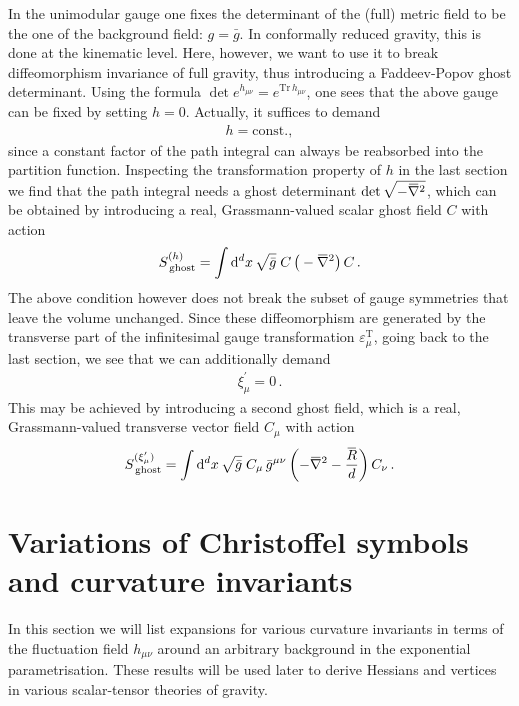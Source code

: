 \documentclass[11pt]{book}
\newcommand{\overbar}[1]{\mkern 1.5mu\overline{\mkern-1.5mu#1\mkern-1.5mu}\mkern 1.5mu}
\newcommand{\bnabla}{\overbar \nabla}
\newcommand{\bR}{\overbar R}
\newcommand{\Tr}{\mathrm{Tr}}
\numberwithin{equation}{chapter}
\begin{document}
\begin{appendices}
In the unimodular gauge one fixes the determinant of the (full) metric field
to be the one of the background field: $g = \bar g$. In conformally reduced
gravity, this is done at the kinematic level. Here, however, we
want to use it to break diffeomorphism invariance of full gravity, thus
introducing a Faddeev-Popov ghost determinant.
Using the formula $\det e^{h_{\mu\nu}} = e^{\Tr \, h_{\mu\nu}}$,
one sees that the above gauge can be fixed by setting $h=0$.
Actually, it suffices to demand
\begin{align}
  h = \mathrm{const.,}
\end{align}
since a constant factor of the path integral can always be reabsorbed into
the partition function. Inspecting the transformation property of $h$
in the last section we find that the path integral needs a ghost
determinant $\det{ \sqrt{-\bnabla^2}}$, which can be obtained by
introducing a real, Grassmann-valued scalar ghost field $C$ with action
\begin{align}
  S_{\,\mathrm{ghost}}^{(h)} = \int \mathrm d^dx \, \sqrt{\bar g} \;
  C \, \big( -\bnabla^2 \big) \, C \,.
\end{align}
The above condition however does not break the subset of gauge symmetries that
leave the volume unchanged. Since these diffeomorphism are generated by the
transverse part of the infinitesimal gauge transformation
$\varepsilon^{\scriptscriptstyle \mathrm T}_\mu$,
going back to the last section, we see that we can additionally demand
\begin{align}
  \xi^\prime_\mu = 0 \,.
\end{align}
This may be achieved by introducing a second ghost field, which is a real,
Grassmann-valued transverse vector field $C_\mu$ with action
\begin{align}
  S_{\,\mathrm{ghost}}^{(\xi^\prime_\mu)} = \int \mathrm d^dx \, \sqrt{\bar g} \;  C_\mu \, \bar g^{\mu\nu}
  \left(-\bnabla^2-\frac{\bR}{d}\right) C_\nu \,.
\end{align}


\section{Variations of Christoffel symbols and curvature invariants}

In this section we will list expansions for various curvature
invariants in terms of the fluctuation field $h_{\mu\nu}$ around
an arbitrary background in the exponential parametrisation.
These results will be used later to derive Hessians and
vertices in various scalar-tensor theories of gravity.


\end{appendices}
\end{document}

